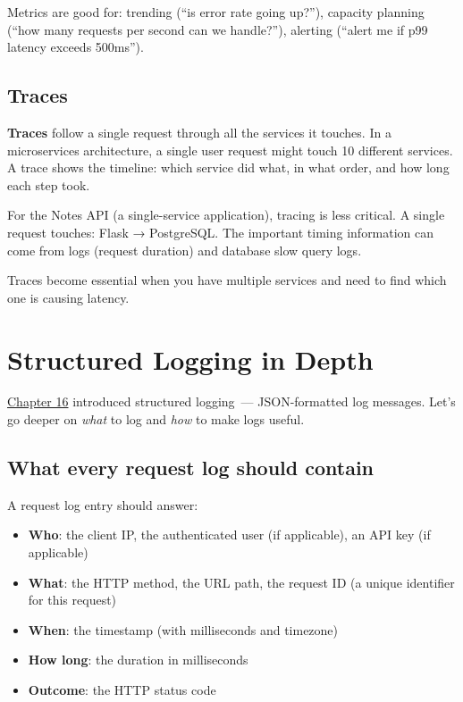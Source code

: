 Metrics are good for: trending (``is error rate going up?''), capacity planning (``how many requests per second can we handle?''), alerting (``alert me if p99 latency exceeds 500ms'').

\subsection*{Traces}\label{35-observability:traces}

\textbf{Traces} follow a single request through all the services it touches. In a microservices architecture, a single user request might touch 10 different services. A trace shows the timeline: which service did what, in what order, and how long each step took.

For the Notes API (a single-service application), tracing is less critical. A single request touches: Flask → PostgreSQL. The important timing information can come from logs (request duration) and database slow query logs.

Traces become essential when you have multiple services and need to find which one is causing latency.

\setcounter{section}{1}
\section{Structured Logging in Depth}\label{35-observability:352-structured-logging-in-depth}

\hyperref[ch:16-logging-error-handling]{Chapter 16} introduced structured logging~--- JSON-formatted log messages. Let's go deeper on \emph{what} to log and \emph{how} to make logs useful.

\subsection*{What every request log should contain}\label{35-observability:what-every-request-log-should-contain}

A request log entry should answer:

\begin{itemize}
\tightlist
\item
  \textbf{Who}: the client IP, the authenticated user (if applicable), an API key (if applicable)
\item
  \textbf{What}: the HTTP method, the URL path, the request ID (a unique identifier for this request)
\item
  \textbf{When}: the timestamp (with milliseconds and timezone)
\item
  \textbf{How long}: the duration in milliseconds
\item
  \textbf{Outcome}: the HTTP status code
\end{itemize}

